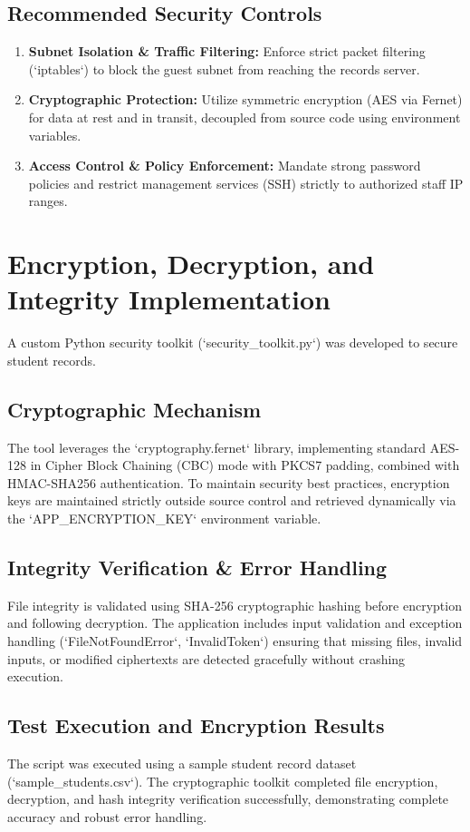 \documentclass[11pt,a4paper]{article}
\begin{document}
\subsection{Recommended Security Controls}
\begin{enumerate}
    \item \textbf{Subnet Isolation \& Traffic Filtering:} Enforce strict packet filtering (`iptables`) to block the guest subnet from reaching the records server.
    \item \textbf{Cryptographic Protection:} Utilize symmetric encryption (AES via Fernet) for data at rest and in transit, decoupled from source code using environment variables.
    \item \textbf{Access Control \& Policy Enforcement:} Mandate strong password policies and restrict management services (SSH) strictly to authorized staff IP ranges.
\end{enumerate}

\section{Encryption, Decryption, and Integrity Implementation}
A custom Python security toolkit (`security_toolkit.py`) was developed to secure student records.

\subsection{Cryptographic Mechanism}
The tool leverages the `cryptography.fernet` library, implementing standard AES-128 in Cipher Block Chaining (CBC) mode with PKCS7 padding, combined with HMAC-SHA256 authentication. To maintain security best practices, encryption keys are maintained strictly outside source control and retrieved dynamically via the `APP_ENCRYPTION_KEY` environment variable.

\subsection{Integrity Verification \& Error Handling}
File integrity is validated using SHA-256 cryptographic hashing before encryption and following decryption. The application includes input validation and exception handling (`FileNotFoundError`, `InvalidToken`) ensuring that missing files, invalid inputs, or modified ciphertexts are detected gracefully without crashing execution.

\subsection{Test Execution and Encryption Results}
The script was executed using a sample student record dataset (`sample_students.csv`). The cryptographic toolkit completed file encryption, decryption, and hash integrity verification successfully, demonstrating complete accuracy and robust error handling.
\end{document}
